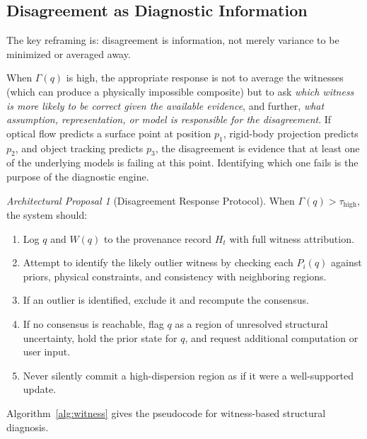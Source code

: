 \documentclass[11pt,a4paper]{article}
\theoremstyle{plain}
\theoremstyle{definition}
\theoremstyle{remark}
\newtheorem{proposal}[theorem]{Architectural Proposal}
\begin{document}
\subsection{Disagreement as Diagnostic Information}

The key reframing is: disagreement is information, not merely variance to be minimized or averaged away.

When $\Gamma(q)$ is high, the appropriate response is not to average the witnesses (which can produce a physically impossible composite) but to ask \textit{which witness is more likely to be correct given the available evidence}, and further, \textit{what assumption, representation, or model is responsible for the disagreement}. If optical flow predicts a surface point at position $p_1$, rigid-body projection predicts $p_2$, and object tracking predicts $p_3$, the disagreement is evidence that at least one of the underlying models is failing at this point. Identifying which one fails is the purpose of the diagnostic engine.

\begin{proposal}[Disagreement Response Protocol]
When $\Gamma(q) > \tau_{\text{high}}$, the system should:
\begin{enumerate}[leftmargin=2em,itemsep=0pt]
\item Log $q$ and $W(q)$ to the provenance record $H_t$ with full witness attribution.
\item Attempt to identify the likely outlier witness by checking each $P_i(q)$ against priors, physical constraints, and consistency with neighboring regions.
\item If an outlier is identified, exclude it and recompute the consensus.
\item If no consensus is reachable, flag $q$ as a region of unresolved structural uncertainty, hold the prior state for $q$, and request additional computation or user input.
\item Never silently commit a high-dispersion region as if it were a well-supported update.
\end{enumerate}
\end{proposal}

Algorithm~\ref{alg:witness} gives the pseudocode for witness-based structural diagnosis.
\end{document}
